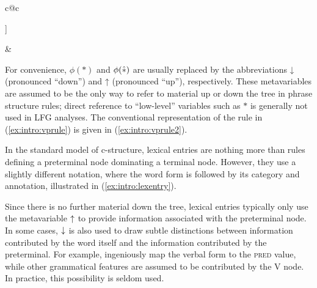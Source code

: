 \documentclass[output=paper]{langscibook}
\begin{document}
 \eas\label{ex:intro:vpmap}
   \begin{tabular}[t]{c@{\hspace*{4em}}c}
   \begin{forest}
    [\rnode{vp}{VP}
      [\rnode{v}{V}
      ]
      [\rnode{np}{NP}
      ]
    ]
    \end{forest} &
    {} 
    \end{tabular}
 \zs
For convenience, $\phi(*)$ and $\phi(\hbox{$\hat{\ast}$})$ are usually replaced by the abbreviations ↓ (pronounced ``down'') and ↑ (pronounced ``up''), respectively. These metavariables are assumed to be the only way to refer to material up or down the tree in phrase structure rules; direct reference to ``low-level'' variables such as $*$ is generally not used in LFG analyses. The conventional representation of the rule in (\ref{ex:intro:vprule}) is given in (\ref{ex:intro:vprule2}).
 
 \ea\label{ex:intro:vprule2}
 \z
 
 In the standard model of c-structure, lexical entries are nothing more than rules defining a preterminal node dominating a terminal node. However, they use a slightly different notation, where the word form is followed by its category and annotation, illustrated in (\ref{ex:intro:lexentry}).
 
 \begin{exe}
   \ex\label{ex:intro:lexentry}
 \end{exe}
Since there is no further material down the tree, lexical entries typically only use the metavariable $\mbox{$\uparrow$}{}$ to provide information associated with the preterminal node. In some cases, $\mbox{$\downarrow$}{}$ is also used to draw subtle distinctions between information contributed by the word itself and the information contributed by the preterminal. For example, \textcite[230]{zaenen-kaplan1995} ingeniously map the verbal form to the \textsc{pred} value, while other grammatical features are assumed to be contributed by the V node. In practice, this possibility is seldom used.
 
\end{document}
